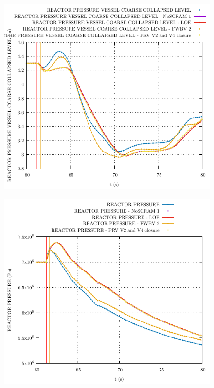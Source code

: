 \documentclass{article}
\begin{document}
\begin{multicols}{2}
\begin{figure}[H]
\centering
\includegraphics[width=\linewidth]{./graphs/REACTOR PRESSURE VESSEL COARSE COLLAPSED LEVEL.pdf}
\end{figure}
\begin{figure}[H]
\centering
\includegraphics[width=\linewidth]{./graphs/REACTOR PRESSURE.pdf}
\end{figure}

\end{multicols}
\end{document}
